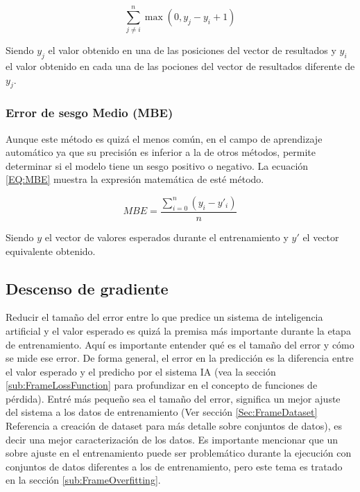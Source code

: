             \begin{equation}
            	\label{EQ:SVMLoss}
                \sum_{j \neq i}^{n} \max(0, y_j - y_i + 1)
            \end{equation}
            
            Siendo $y_j$ el valor obtenido en una de las posiciones del vector de resultados y $y_i$ el valor obtenido en cada una de las pociones del vector de resultados diferente de $y_j$.
        
        \subsubsection{Error de sesgo Medio (MBE) }
        \label{sub2:FrameMBE}
        
            Aunque este método es quizá el menos común, en el campo de aprendizaje automático ya que su precisión es inferior a la de otros métodos, permite determinar si el modelo tiene un sesgo positivo o negativo. La ecuación \ref{EQ:MBE} muestra la expresión matemática de esté método.
            
            \begin{equation}
            	\label{EQ:MBE}
            	MBE = \frac{ \sum_{i=0}^{n} ( y_i - y'_i )}{n}
            \end{equation}
                
            Siendo $y$ el vector de valores esperados durante el entrenamiento y $y'$ el vector equivalente obtenido.
        
    \subsection{Descenso de gradiente}
    \label{sub:FrameGradient}
    
        Reducir el tamaño del error entre lo que predice un sistema de inteligencia artificial y el valor esperado es quizá la premisa más importante durante la etapa de entrenamiento. Aquí es importante entender qué es el tamaño del error y cómo se mide ese error. De forma general, el error en la predicción es la diferencia entre el valor esperado y el predicho por el sistema IA (vea la sección \ref{sub:FrameLossFunction} para profundizar en el concepto de funciones de pérdida). Entré más pequeño sea el tamaño del error, significa un mejor ajuste del sistema a los datos de entrenamiento (Ver sección \ref{Sec:FrameDataset} Referencia a creación de dataset para más detalle sobre conjuntos de datos), es decir una mejor caracterización de los datos. Es importante mencionar que un sobre ajuste en el entrenamiento puede ser problemático durante la ejecución con conjuntos de datos diferentes a los de entrenamiento, pero este tema es tratado en la sección \ref{sub:FrameOverfitting}.
        
